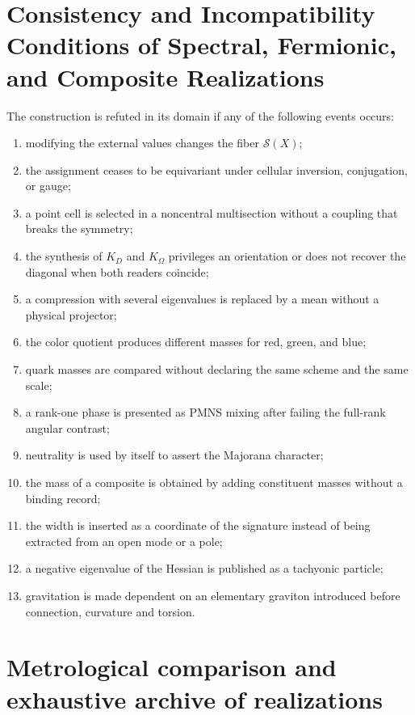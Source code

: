 \section{Consistency and Incompatibility Conditions of Spectral, Fermionic, and Composite Realizations}

The construction is refuted in its domain if any of the following events occurs:

\begin{enumerate}
\item modifying the external values changes the fiber \(\mathscr S(X)\);
\item the assignment ceases to be equivariant under cellular inversion,
      conjugation, or gauge;
\item a point cell is selected in a noncentral multisection without a
      coupling that breaks the symmetry;
\item the synthesis of \(K_D\) and \(K_\Omega\) privileges an orientation or does not
      recover the diagonal when both readers coincide;
\item a compression with several eigenvalues is replaced by a mean without
      a physical projector;
\item the color quotient produces different masses for red, green, and blue;
\item quark masses are compared without declaring the same scheme and the same scale;
\item a rank-one phase is presented as PMNS mixing after failing the
      full-rank angular contrast;
\item neutrality is used by itself to assert the Majorana character;
\item the mass of a composite is obtained by adding constituent masses without
      a binding record;
\item the width is inserted as a coordinate of the signature instead of being extracted from
      an open mode or a pole;
\item a negative eigenvalue of the Hessian is published as a tachyonic particle;
\item gravitation is made dependent on an elementary graviton introduced
      before connection, curvature and torsion.
\end{enumerate}

\section{Metrological comparison and exhaustive archive of realizations}

